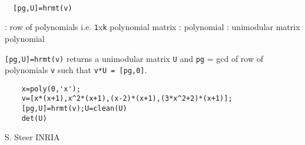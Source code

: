
\begin{mandesc}
   \\ %
\end{mandesc}
\begin{calling_sequence}
\begin{verbatim}
  [pg,U]=hrmt(v)  
\end{verbatim}
\end{calling_sequence}
\begin{parameters}
  \begin{varlist}
    : row of polynomials i.e. \verb!1!x\verb!k! polynomial matrix
    : polynomial
    : unimodular matrix polynomial
  \end{varlist}
\end{parameters}
\begin{mandescription}
  \verb![pg,U]=hrmt(v)! returns a unimodular matrix \verb!U! and  \verb!pg! = gcd of row of 
  polynomials \verb!v! such that \verb!v*U = [pg,0]!.
\end{mandescription}
\begin{examples}
  \begin{Verbatim}
    x=poly(0,'x');
    v=[x*(x+1),x^2*(x+1),(x-2)*(x+1),(3*x^2+2)*(x+1)];
    [pg,U]=hrmt(v);U=clean(U)
    det(U)
  \end{Verbatim}
\end{examples}
\begin{manseealso}
     
\end{manseealso}
\begin{authors}
  S. Steer INRIA
\end{authors}
